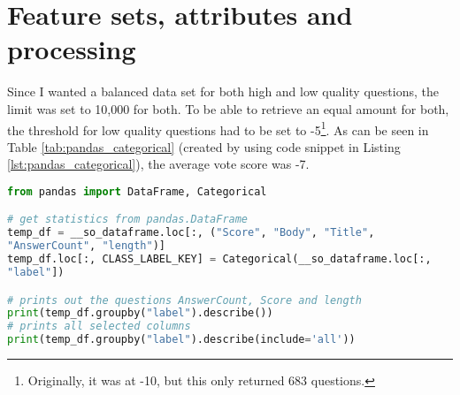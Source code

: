 \section{Feature sets, attributes and processing}
\label{sec:feature_sets}
Since I wanted a balanced data set for both high and low quality questions, the limit was set to 10,000 for both.
To be able to retrieve an equal amount for both, the threshold for low quality questions had to be set to -5\footnote{
	Originally, it was at -10, but this only returned 683 questions. 
}.
As can be seen in Table \ref{tab:pandas_categorical} (created by using code snippet in Listing \ref{lst:pandas_categorical}), the average vote score was -7.

\begin{comment}
When retrieving the questions from the database, the vote score was set to less than -10 for bad question and greater than 50 for good questions (retrieval limit set to 10,000; 20,000 total). 
However, the vote score was set too low for the bad questions, since only 683 rows was returned. 
Therefore, the score was then set to less than -5. 
What was also found when using pandas.Categorical to get an overview (code snippet in Listing \ref{lst:pandas_categorical} and result in Table \ref{tab:pandas_categorical}), 
one can see that for the 10,000 bad questions, the average vote score was -7. This could be an indicator that when a question has a vote score below -5, they are ignored.
\end{comment}

\begin{lstlisting}[caption={Getting Categorical data from pandas.DataFrame}, 
label={lst:pandas_categorical}, language={Python}, basicstyle=\small] 
from pandas import DataFrame, Categorical

# get statistics from pandas.DataFrame
temp_df = __so_dataframe.loc[:, ("Score", "Body", "Title", 
"AnswerCount", "length")]
temp_df.loc[:, CLASS_LABEL_KEY] = Categorical(__so_dataframe.loc[:, 
"label"])

# prints out the questions AnswerCount, Score and length
print(temp_df.groupby("label").describe())
# prints all selected columns
print(temp_df.groupby("label").describe(include='all'))
\end{lstlisting}


